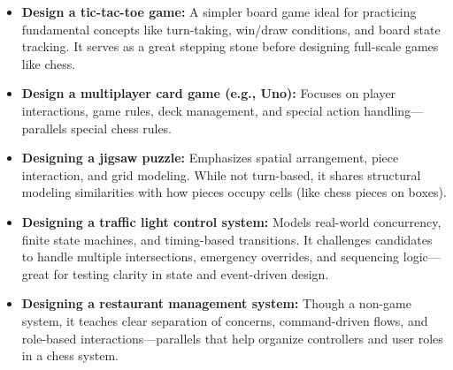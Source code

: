\begin{itemize}
\item
\protect{}\label{0bN5RpjIbe-YoI0OdbWzS}
\textbf{Design a tic-tac-toe game:} A simpler board game ideal for practicing fundamental concepts like turn-taking, win/draw conditions, and board state tracking. It serves as a great stepping stone before designing full-scale games like chess.
\item
\protect{}\label{L_GPrF345itTP0fp5PGF9}
\textbf{Design a multiplayer card game (e.g., Uno):} Focuses on player interactions, game rules, deck management, and special action handling---parallels special chess rules.
\item
\protect{}\label{5spmK0asrlKjgUR189QsP}
\textbf{Designing a jigsaw puzzle:} Emphasizes spatial arrangement, piece interaction, and grid modeling. While not turn-based, it shares structural modeling similarities with how pieces occupy cells (like chess pieces on boxes).
\item
\protect{}\label{glAFFQqQOeUa8vzVsVyOw}
\textbf{Designing a traffic light control system:} Models real-world concurrency, finite state machines, and timing-based transitions. It challenges candidates to handle multiple intersections, emergency overrides, and sequencing logic---great for testing clarity in state and event-driven design.
\item
\protect{}\label{XHNOOLL1wdJLq5-ENjwhe}
\textbf{Designing a restaurant management system:} Though a non-game system, it teaches clear separation of concerns, command-driven flows, and role-based interactions---parallels that help organize controllers and user roles in a chess system.
\end{itemize}

